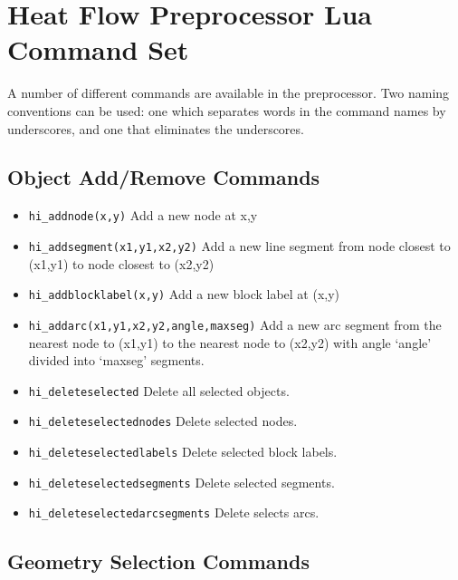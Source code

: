 ﻿\section{Heat Flow Preprocessor Lua Command Set}

A number of different commands are available in the preprocessor.
Two naming conventions can be used: one which separates words in
the command names by underscores, and one that eliminates the
underscores.

\subsection{Object Add/Remove Commands}
\begin{itemize}
\item {\tt hi\_addnode(x,y)} Add a new node at x,y

\item {\tt hi\_addsegment(x1,y1,x2,y2)} Add a new line segment from node closest to
(x1,y1) to node closest to (x2,y2)

\item {\tt hi\_addblocklabel(x,y)} Add a new block label at (x,y)

\item {\tt hi\_addarc(x1,y1,x2,y2,angle,maxseg)} Add a new arc segment from the
nearest node to (x1,y1) to the nearest node to (x2,y2) with angle `angle'
divided into `maxseg' segments.

\item {\tt hi\_deleteselected} Delete all selected objects.

\item {\tt hi\_deleteselectednodes} Delete selected nodes.

\item {\tt hi\_deleteselectedlabels} Delete selected block labels.

\item {\tt hi\_deleteselectedsegments} Delete selected segments.

\item {\tt hi\_deleteselectedarcsegments} Delete selects arcs.
\end{itemize}


\subsection{Geometry Selection Commands}

